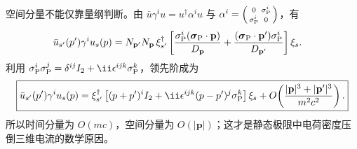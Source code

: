 \begin{derivation}
空间分量不能仅靠量纲判断。由
$\bar u\gamma^iu=u^\dagger\alpha^iu$ 与
$\alpha^i=\begin{psmallmatrix}0&\sigma_{\rm P}^i\\
\sigma_{\rm P}^i&0\end{psmallmatrix}$，有
\begin{align*}
 \bar u_{s'}(p')\gamma^iu_s(p)
 ={}&N_{\mathbf p'}N_{\mathbf p}\,
 \xi_{s'}^\dagger\left[
 \frac{\sigma_{\rm P}^i(\boldsymbol\sigma_{\rm P}\cdot\mathbf p)}{D_{\mathbf p}}
 +\frac{(\boldsymbol\sigma_{\rm P}\cdot\mathbf p')\sigma_{\rm P}^i}{D_{\mathbf p'}}
 \right]\xi_s.
\end{align*}
利用
$\sigma_{\rm P}^i\sigma_{\rm P}^j
=\delta^{ij}I_2+\ii\epsilon^{ijk}\sigma_{\rm P}^k$，领先阶成为
\begin{equation*}
 \boxed{
 \bar u_{s'}(p')\gamma^iu_s(p)
 =\xi_{s'}^\dagger\left[
 (p+p')^i I_2
 +\ii\epsilon^{ijk}(p-p')^j\sigma_{\rm P}^k
 \right]\xi_s
 +O\!\left(\frac{|\mathbf p|^3+|\mathbf p'|^3}{m^2c^2}\right).}
\end{equation*}
所以时间分量为 $O(mc)$，空间分量为 $O(|\mathbf p|)$；这才是静态极限中电荷密度压倒三维电流的数学原因。


\end{derivation}
